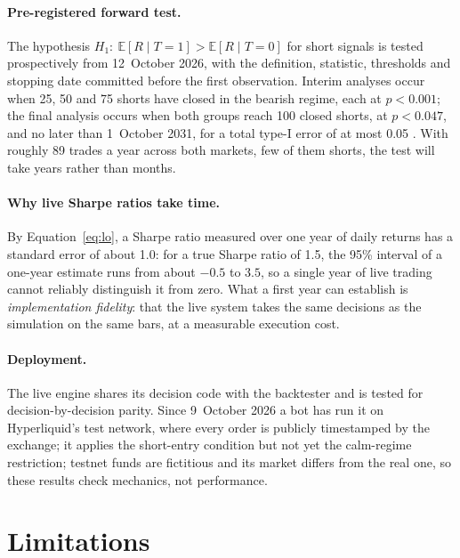 \documentclass[11pt,a4paper]{article}
\newcommand{\E}{\mathbb{E}}
\newcommand{\1}{\mathbf{1}}
\begin{document}
\paragraph{Pre-registered forward test.} The hypothesis $H_1:\ \E[R\mid T=1]>\E[R\mid T=0]$ for short signals is tested prospectively from 12~October 2026, with the definition, statistic, thresholds and stopping date committed before the first observation. Interim analyses occur when 25, 50 and 75 shorts have closed in the bearish regime, each at $p<0.001$; the final analysis occurs when both groups reach 100 closed shorts, at $p<0.047$, and no later than 1~October 2031, for a total type-I error of at most 0.05 \citep{Haybittle1971,PetoEtAl1976}. With roughly 89 trades a year across both markets, few of them shorts, the test will take years rather than months.

\paragraph{Why live Sharpe ratios take time.} By Equation~\eqref{eq:lo}, a Sharpe ratio measured over one year of daily returns has a standard error of about 1.0: for a true Sharpe ratio of 1.5, the 95\% interval of a one-year estimate runs from about $-0.5$ to $3.5$, so a single year of live trading cannot reliably distinguish it from zero. What a first year can establish is \emph{implementation fidelity}: that the live system takes the same decisions as the simulation on the same bars, at a measurable execution cost.

\paragraph{Deployment.} The live engine shares its decision code with the backtester and is tested for decision-by-decision parity. Since 9~October 2026 a bot has run it on Hyperliquid's test network, where every order is publicly timestamped by the exchange; it applies the short-entry condition but not yet the calm-regime restriction; testnet funds are fictitious and its market differs from the real one, so these results check mechanics, not performance.

\section{Limitations}
\end{document}
